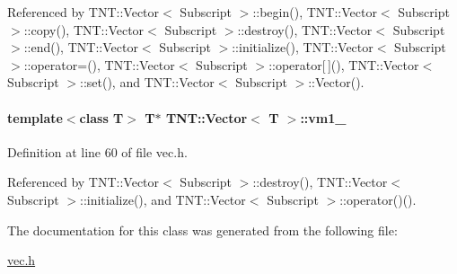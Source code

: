 Referenced by TNT::Vector$<$ Subscript $>$::begin(), TNT::Vector$<$ Subscript $>$::copy(), TNT::Vector$<$ Subscript $>$::destroy(), TNT::Vector$<$ Subscript $>$::end(), TNT::Vector$<$ Subscript $>$::initialize(), TNT::Vector$<$ Subscript $>$::operator=(), TNT::Vector$<$ Subscript $>$::operator\mbox{[}$\,$\mbox{]}(), TNT::Vector$<$ Subscript $>$::set(), and TNT::Vector$<$ Subscript $>$::Vector().

\paragraph[{vm1\_\-}]{\setlength{\rightskip}{0pt plus 5cm}template$<$class T$>$ T$\ast$ {\bf TNT::Vector}$<$ T $>$::{\bf vm1\_\-}}\hfill\label{class_t_n_t_1_1_vector_a55f5ebf43f5af53aabdfae15a1ce11d4}


Definition at line 60 of file vec.h.



Referenced by TNT::Vector$<$ Subscript $>$::destroy(), TNT::Vector$<$ Subscript $>$::initialize(), and TNT::Vector$<$ Subscript $>$::operator()().



The documentation for this class was generated from the following file:\begin{DoxyCompactItemize}
\item 
\hyperlink{vec_8h}{vec.h}\end{DoxyCompactItemize}

